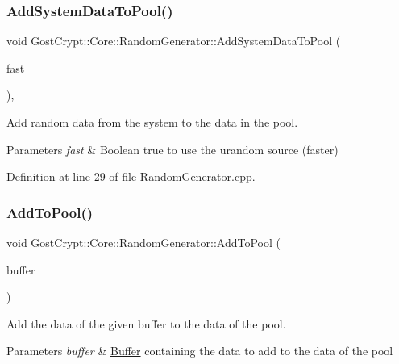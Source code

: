 \subsubsection{\texorpdfstring{Add\+System\+Data\+To\+Pool()}{AddSystemDataToPool()}}
{\footnotesize\ttfamily void Gost\+Crypt\+::\+Core\+::\+Random\+Generator\+::\+Add\+System\+Data\+To\+Pool (\begin{DoxyParamCaption}\item[{bool}]{fast }\end{DoxyParamCaption})\hspace{0.3cm}{\ttfamily [static]}, {\ttfamily [protected]}}



Add random data from the system to the data in the pool. 


\begin{DoxyParams}{Parameters}
{\em fast} & Boolean true to use the urandom source (faster) \\
\hline
\end{DoxyParams}


Definition at line 29 of file Random\+Generator.\+cpp.

\mbox{\label{class_gost_crypt_1_1_core_1_1_random_generator_aedad8e5c5552eb470b55793a94b0a441}} 
\subsubsection{\texorpdfstring{Add\+To\+Pool()}{AddToPool()}}
{\footnotesize\ttfamily void Gost\+Crypt\+::\+Core\+::\+Random\+Generator\+::\+Add\+To\+Pool (\begin{DoxyParamCaption}\item[{const \hyperlink{class_gost_crypt_1_1_buffer_ptr}{Buffer\+Ptr} \&}]{buffer }\end{DoxyParamCaption})\hspace{0.3cm}{\ttfamily [static]}}



Add the data of the given buffer to the data of the pool. 


\begin{DoxyParams}{Parameters}
{\em buffer} & \hyperlink{class_gost_crypt_1_1_buffer}{Buffer} containing the data to add to the data of the pool \\
\hline
\end{DoxyParams}


